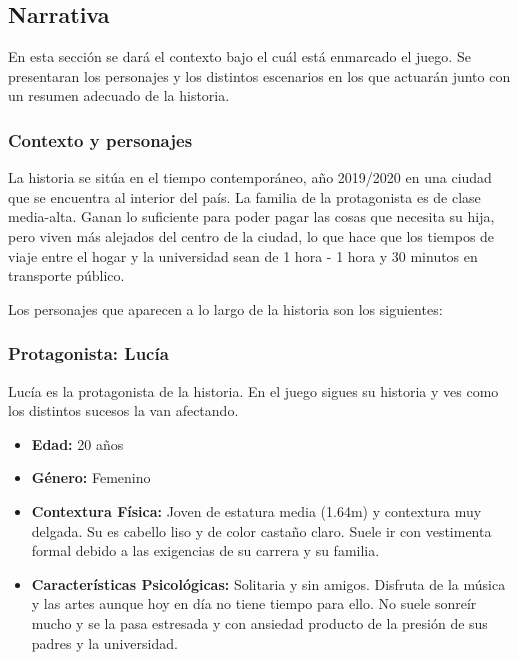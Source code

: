

\subsection{Narrativa}

En esta sección se dará el contexto bajo el cuál está enmarcado el juego. Se presentaran los personajes y los distintos escenarios en los que actuarán junto con un resumen adecuado de la historia.

\subsubsection{Contexto y personajes}
La historia se sitúa en el tiempo contemporáneo, año 2019/2020 en una ciudad que se encuentra al interior del país. La familia de la protagonista es de clase media-alta. Ganan lo suficiente para poder pagar las cosas que necesita su hija, pero viven más alejados del centro de la ciudad, lo que hace que los tiempos de viaje entre el hogar y la universidad sean de 1 hora - 1 hora y 30 minutos en transporte público.

Los personajes que aparecen a lo largo de la historia son los siguientes:

\subsubsection{Protagonista: Lucía}
Lucía es la protagonista de la historia. En el juego sigues su historia y ves como los distintos sucesos la van afectando.

\begin{itemize}
    \item \textbf{Edad:} 20 años
    \item \textbf{Género:} Femenino
    \item \textbf{Contextura Física:} Joven de estatura media (1.64m) y contextura muy delgada. Su es cabello liso y de color castaño claro. Suele ir con vestimenta formal debido a las exigencias de su carrera y su familia.
    \item \textbf{Características Psicológicas:} Solitaria y sin amigos. Disfruta de la música y las artes aunque hoy en día no tiene tiempo para ello. No suele sonreír mucho y se la pasa estresada y con ansiedad producto de la presión de sus padres y la universidad.
\end{itemize}


